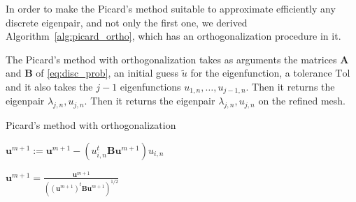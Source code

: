 \documentclass[preprint,12pt]{elsarticle}
\begin{document}
In order to make the Picard's method suitable to approximate efficiently any discrete eigenpair, and not only the first one, we derived Algorithm~\ref{alg:picard_ortho}, which has an orthogonalization procedure in it.

The Picard's method with orthogonalization takes as arguments the matrices $\mathbf{A}$ and $\mathbf{B}$ of \eqref{eq:disc_prob}, an initial guess $\tilde u$ for the eigenfunction, a tolerance $\mathrm{Tol}$ and it also takes the $j-1$ eigenfunctions $u_{1,n},\dots,u_{j-1,n}$.
Then it returns the eigenpair $\lambda_{j,n},u_{j,n}$. 
Then it returns the eigenpair $\lambda_{j,n},u_{j,n}$ on the refined mesh.





\begin{algorithm}[H] \caption{Picard's method with orthogonalization} \label{alg:picard_ortho} 
\begin{algorithmic}

    

\REPEAT



\STATE $\mathbf{u}^{m+1}:=\mathbf{u}^{m+1}-(u_{i,n}^t\mathbf{B}\mathbf{u}^{m+1})u_{i,n}$
\ENDFOR


\STATE $\displaystyle \mathbf{u}^{m+1}=\frac{\mathbf{u}^{m+1}}{((\mathbf{u}^{m+1})^t\mathbf{B}\mathbf{u}^{m+1})^{1/2}}$
\end{algorithmic}
\end{algorithm}
\end{document}
